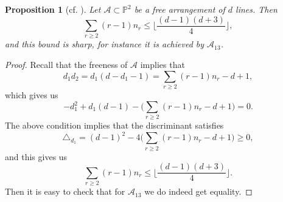 \documentclass[12pt]{amsart}
\theoremstyle{plain}
\newtheorem{prop}[subsection]{Proposition}
\theoremstyle{definition}
\numberwithin{equation}{section}
\newcommand{\A}{{\mathcal A}}
\begin{document}
\begin{prop}[cf. {\cite[Proposition 6.5]{Osaka}}]
\label{propCOMB}
Let $\A \subset \mathbb{P}^{2}$ be a free arrangement of $d$ lines. Then
$$\sum_{r\geq 2}(r-1)n_{r} \leq \bigg\lfloor \frac{(d-1)(d+3)}{4}\bigg\rfloor,$$
and this bound is sharp, for instance it is achieved by $\mathcal{A}_{13}$.

\end{prop}
\begin{proof}
Recall that the freeness of $\A$ implies that 
$$d_{1}d_{2} = d_{1}(d-d_{1}-1) = \sum_{r\geq 2}(r-1)n_{r}-d+1,$$
which gives us 
$$-d_{1}^{2}+d_{1}(d-1) - \bigg(\sum_{r\geq 2}(r-1)n_{r}-d+1\bigg)=0.$$
The above condition implies that the discriminant satisfies
$$\triangle_{d_{1}} = (d-1)^2 - 4\bigg(\sum_{r\geq 2}(r-1)n_{r}-d+1\bigg) \geq 0,$$
and this gives us
$$\sum_{r\geq 2}(r-1)n_{r} \leq \bigg\lfloor \frac{(d-1)(d+3)}{4}\bigg\rfloor.$$
Then it is easy to check that for $\A_{13}$ we do indeed get equality.
\end{proof}
\end{document}
